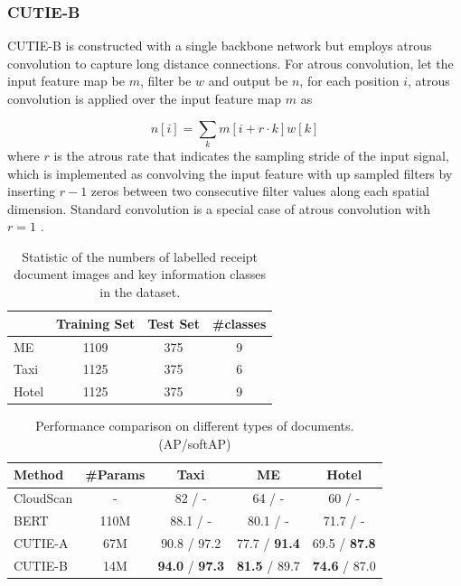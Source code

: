 \documentclass[10pt,twocolumn,letterpaper]{article}
\begin{document}
\subsubsection{CUTIE-B}
CUTIE-B is constructed with a single backbone network but employs atrous convolution to capture long distance connections. For atrous convolution, let the input feature map be $m$, filter be $w$ and output be $n$, for each position $i$, atrous convolution is applied over the input feature map $m$ as 

\begin{equation}
n[i] = \sum_k m[i+r\cdot k]w[k]
\end{equation}
where $r$ is the atrous rate that indicates the sampling stride of the input signal, which is implemented as convolving the input feature with up sampled filters by inserting $r-1$ zeros between two consecutive filter values along each spatial dimension. Standard convolution is a special case of atrous convolution with $r=1$ \cite{deeplabv1}.

\begin{table}
	\caption{Statistic of the numbers of labelled receipt document images and key information classes in the dataset.}
\begin{center}
\begin{tabular}{l | c | c | c}
	 & Training Set & Test Set & \#classes \\
	\hline
	ME & 1109 & 375 & 9 \\
	Taxi & 1125 & 375 & 6 \\
	Hotel & 1125 & 375 & 9 \\
\end{tabular}
\end{center}
	\label{tab:dataset}
\end{table}

\begin{table}
	\caption{Performance comparison on different types of documents. (AP/softAP)}
\begin{center}
\begin{tabular}{l | c | c | c | c}
	Method & \#Params & Taxi & ME & Hotel \\
	\hline
	CloudScan\cite{cloudscan} & - & 82 / - & 64 / - & 60 / - \\
	BERT\cite{bert} & 110M & 88.1 / - & 80.1 / - & 71.7 / - \\
	CUTIE-A & 67M & 90.8 / 97.2 & 77.7 / \textbf{91.4} & 69.5 / \textbf{87.8} \\
	CUTIE-B & 14M & \textbf{94.0} / \textbf{97.3} & \textbf{81.5} / 89.7 & \textbf{74.6} / 87.0 \\
\end{tabular}
\end{center}
	\label{tab:comparison}
\end{table}
\end{document}
